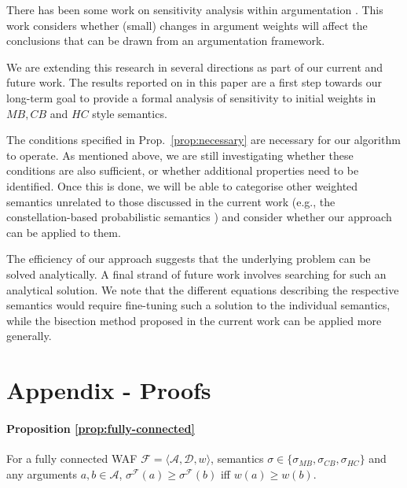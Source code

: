 \documentclass{article}
\newcommand{\AF}{\mathcal{F}}
\newcommand{\A}{\mathcal{A}}
\newcommand{\D}{\mathcal{D}}
\begin{document}
There has been some work on sensitivity analysis within argumentation \cite{tang2016markovargumentationrandom}. This work considers whether (small) changes in argument weights will affect the conclusions that can be drawn from an argumentation framework. 

We are extending this research in several directions as part of our current and future work. The results reported on in this paper are a first step towards our long-term goal to provide a formal analysis of sensitivity to initial weights in $MB, CB$ and $HC$ style semantics.

The conditions specified in Prop.~\ref{prop:necessary} are necessary for our algorithm to operate. As mentioned above, we are still investigating whether these conditions are also sufficient, or whether additional properties need to be identified. Once this is done, we will be able to categorise other weighted semantics unrelated to those discussed in the current work (e.g., the constellation-based probabilistic semantics \cite{li11probabilistic}) and consider whether our approach can be applied to them. 

The efficiency of our approach suggests that the underlying problem can be solved analytically. A final strand of future work involves searching for such an analytical solution. We note that the different equations describing the respective semantics would require fine-tuning such a solution to the individual semantics, while the bisection method proposed in the current work can be applied more generally.






\newpage





\appendix 

\newpage 

\section{Appendix - Proofs}


\paragraph{Proposition \ref{prop:fully-connected}} For a fully connected WAF $\AF=\langle \A, \D, w \rangle$, semantics $\sigma \in \{\sigma_{MB}, \sigma_{CB}, \sigma_{HC}\}$ and any arguments $a,b \in \A$, $\sigma^\AF(a) \geq \sigma^{\AF}(b)$ iff $w(a) \geq w(b)$.
\end{document}
